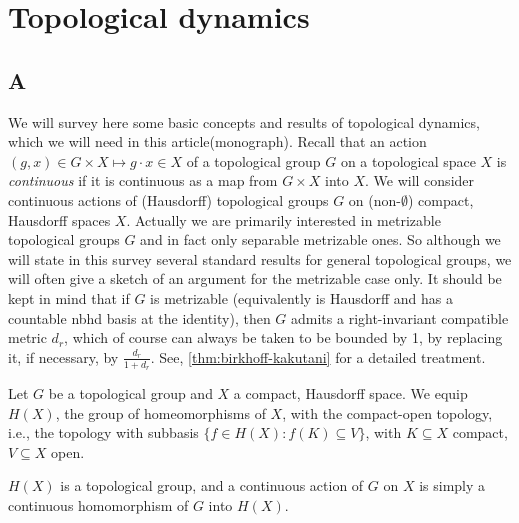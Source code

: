\chapter{Topological dynamics}





\section{A}

We will survey here some basic
concepts and results of topological dynamics, which we will need in this article(monograph). Recall that an action $(g,x)\in G\times X\mapsto g\cdot x\in X$ of a topological group $G$ on a topological space $X$ is {\it continuous} if it is continuous as a map from $G\times X$ into $X$.
We will consider continuous actions of (Hausdorff) topological groups $G$  on (non-$\emptyset$) compact, Hausdorff spaces $X$.
Actually we are primarily interested in metrizable topological groups $G$ and in fact only separable metrizable ones.
So although we will state in this survey several standard results for general topological groups, we will often give a sketch of an argument for the metrizable case only.
It should be kept in mind that if $G$ is metrizable (equivalently is Hausdorff and has a countable nbhd basis at the identity), then $G$ admits a right-invariant compatible metric $d_r$, which of course can always be taken to be bounded by 1, by replacing it, if necessary, by $\tfrac{d_r}{1+d_r}$.  See, \ref{thm:birkhoff-kakutani} for a detailed treatment.







Let $G$ be a topological group and $X$ a compact, Hausdorff space. We equip $H(X)$, the group of homeomorphisms
of $X$, with the compact-open topology, i.e., the topology with subbasis
$\{f\in H(X):f(K)\subseteq V\}$, with $K\subseteq X$ compact, $V\subseteq
    X$ open.


\begin{theorem}
    $H(X)$ is a topological group, and a continuous action of $G$
    on $X$ is simply a continuous homomorphism of $G$ into $H(X)$.
\end{theorem}

